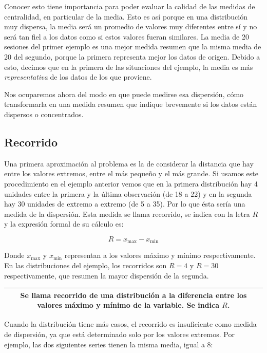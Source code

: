 \documentclass[]{book}
\begin{document}
Conocer esto tiene importancia para poder evaluar la calidad de las medidas de centralidad, en particular de la media. Esto es así porque en una distribución muy dispersa, la media será un promedio de valores muy diferentes entre sí y no será tan fiel a los datos como si estos valores fueran similares. La media de 20 sesiones del primer ejemplo es una mejor medida resumen que la misma media de 20 del segundo, porque la primera representa mejor los datos de origen. Debido a esto, decimos que en la primera de las situaciones del ejemplo, la media es más \emph{representativa} de los datos de los que proviene.

Nos ocuparemos ahora del modo en que puede medirse esa dispersión, cómo transformarla en una medida resumen que indique brevemente si los datos están dispersos o concentrados.

\hypertarget{recorrido}{%
\subsection{Recorrido}\label{recorrido}}

Una primera aproximación al problema es la de considerar la distancia que hay entre los valores extremos, entre el más pequeño y el más grande. Si usamos este procedimiento en el ejemplo anterior vemos que en la primera distribución hay 4 unidades entre la primera y la última observación (de 18 a 22) y en la segunda hay 30 unidades de extremo a extremo (de 5 a 35). Por lo que ésta sería una medida de la dispersión.
Esta medida se llama recorrido, se indica con la letra \(R\) y la expresión formal de su cálculo es:

\[R = x_{\max} - x_{\min}\]

Donde \(x_{\max}\) y \(x_{\min}\) representan a los valores máximo y mínimo
respectivamente. En las distribuciones del ejemplo, los recorridos son
\(R=4\) y \(R=30\) respectivamente, que resumen la mayor dispersión de la
segunda.

\begin{longtable}[]{@{}c@{}}
\toprule
\endhead
\begin{minipage}[t]{0.97\columnwidth}\centering
Se llama \textbf{recorrido} de una distribución a la diferencia entre los valores máximo y mínimo de la variable. Se indica \(R\).\strut
\end{minipage}\tabularnewline
\bottomrule
\end{longtable}

Cuando la distribución tiene más casos, el recorrido es insuficiente
como medida de dispersión, ya que está determinado solo por los valores
extremos. Por ejemplo, las dos siguientes series tienen la misma media,
igual a 8:
\end{document}
